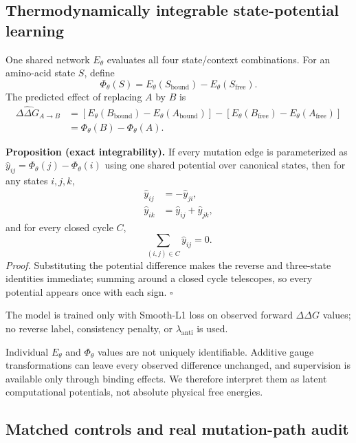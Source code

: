 \documentclass[preprint,12pt]{elsarticle}
\newcommand{\ddg}{\Delta\Delta G}
\begin{document}
\subsection{Thermodynamically integrable state-potential learning}

One shared network $E_\theta$ evaluates all four state/context combinations. For an amino-acid state $S$, define
\begin{equation}
  \Phi_\theta(S)=E_\theta(S_{\mathrm{bound}})-E_\theta(S_{\mathrm{free}}).
  \label{eq:binding_potential}
\end{equation}
The predicted effect of replacing $A$ by $B$ is
\begin{align}
 \widehat{\ddg}_{A\rightarrow B}
 &=\left[E_\theta(B_{\mathrm{bound}})-E_\theta(A_{\mathrm{bound}})\right]
   -\left[E_\theta(B_{\mathrm{free}})-E_\theta(A_{\mathrm{free}})\right] \\
 &=\Phi_\theta(B)-\Phi_\theta(A).
 \label{eq:four_state_cycle}
\end{align}

\noindent\textbf{Proposition (exact integrability).}
If every mutation edge is parameterized as
$\widehat{y}_{ij}=\Phi_\theta(j)-\Phi_\theta(i)$ using one shared potential
over canonical states, then for any states $i,j,k$,
\begin{align}
 \widehat{y}_{ij}&=-\widehat{y}_{ji},\\
 \widehat{y}_{ik}&=\widehat{y}_{ij}+\widehat{y}_{jk},
 \label{eq:exact_properties}
\end{align}
and for every closed cycle $C$,
\begin{equation}
 \sum_{(i,j)\in C}\widehat{y}_{ij}=0.
 \label{eq:closed_cycle}
\end{equation}
\textit{Proof.} Substituting the potential difference makes the reverse and
three-state identities immediate; summing around a closed cycle telescopes,
so every potential appears once with each sign. \hfill$\square$

The model is trained only with Smooth-L1 loss on observed forward $\ddg$
values; no reverse label, consistency penalty, or $\lambda_{\mathrm{anti}}$ is
used.

Individual $E_\theta$ and $\Phi_\theta$ values are not uniquely identifiable. Additive gauge transformations can leave every observed difference unchanged, and supervision is available only through binding effects. We therefore interpret them as latent computational potentials, not absolute physical free energies.

\subsection{Matched controls and real mutation-path audit}
\end{document}
